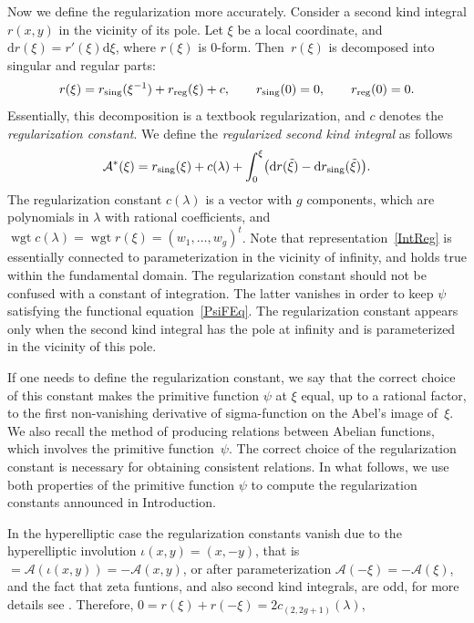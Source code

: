 \documentclass[pdftex]{sigma}
\numberwithin{equation}{section}
\DeclareMathOperator{\wgt}{wgt}
\newcommand{\rmd}{\mathrm{d}}
\begin{document}
Now we define the regularization more accurately. Consider a second kind integral $r(x,y)$ in the vicinity of its pole. Let $\xi$ be a local coordinate, and $\rmd r(\xi)=r'(\xi)\rmd \xi$, where $r(\xi)$ is $0$-form. Then~$r(\xi)$ is decomposed into singular and regular parts:
\begin{gather*}%
 r(\xi) = r_{\textup{sing}}(\xi^{-1}) + r_{\textup{reg}}(\xi) + c,\qquad r_{\textup{sing}}(0)=0,\qquad r_{\textup{reg}}(0)=0.
\end{gather*}
Essentially, this decomposition is a textbook regularization, and $c$ denotes the \emph{regularization constant}. We define the \emph{regularized second kind integral} as follows
\begin{gather}\label{IntReg}
 \mathcal{A}^\ast(\xi)= r_{\textup{sing}} (\xi)
+ c(\lambda) + \int_0^{\xi} \bigl(\rmd r(\tilde{\xi})- \rmd r_{\textup{sing}} (\tilde{\xi}) \bigr).
\end{gather}
The regularization constant $c(\lambda)$ {is a vector with $g$ components, which are} polynomials in $\lambda$ with rational coefficients, and $\wgt c(\lambda) = \wgt r(\xi) = (w_1,\dots,w_g)^t$. Note that representation~\eqref{IntReg} is essentially connected to parameterization in the vicinity of infinity, and holds true within the fundamental domain. The regularization constant should not be confused with a constant of integration. The latter vanishes in order to keep $\psi$ satisfying the functional equation~\eqref{PsiFEq}. The regularization constant appears only when the second kind integral has the pole at infinity and is parameterized in the vicinity of this pole.

If one needs to define the regularization constant, we say that the correct choice of this constant makes the primitive function $\psi$ at $\xi$ equal, up to a rational factor, to the first non-vanishing derivative of sigma-function on the Abel's image of~$\xi$. We also recall {the method} of producing relations between Abelian functions, which involves the primitive function~$\psi$. The correct choice of the regularization constant is necessary for obtaining consistent relations. In what follows, we use both properties of the primitive function $\psi$ to compute the regularization constants announced in Introduction.

In the hyperelliptic case the regularization constants vanish due to the hyperelliptic involution $\iota(x,y) = (x,-y)$, that is $ = \mathcal{A}(\iota(x,y)) = -\mathcal{A}(x,y)$, or after parameterization $\mathcal{A}(-\xi) = -\mathcal{A}(\xi)$, and the fact that zeta funtions, and also second kind integrals, are odd, for more details see \cite[Section~193]{BakerAF}. Therefore, $0=r(\xi)+r(-\xi)=2c_{(2,2g+1)}(\lambda)$,
\end{document}
